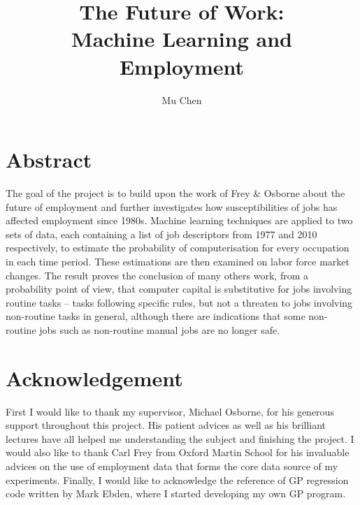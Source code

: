 \documentclass[11pt]{report}
\title{The Future of Work: \\ Machine Learning and Employment}
\author{Mu Chen}
\numberwithin{equation}{chapter}
\begin{document}
\newpage
\maketitle
\section*{Abstract}
The goal of the project is to build upon the work of Frey \& Osborne\cite{frey2013future} about the future of employment and further investigates how susceptibilities of jobs has affected employment since 1980s.  Machine learning techniques are applied to two sets of data, each containing a list of job descriptors from 1977 and 2010 respectively, to estimate the probability of computerisation for every occupation in each time period. These estimations are then examined on labor force market changes. The result proves the conclusion of many others work\cite{david2001skill}, from a probability point of view, that computer capital is substitutive for jobs involving routine tasks -- tasks following specific rules, but not a threaten to jobs involving non-routine tasks in general, although there are indications that some non-routine jobs such as non-routine manual jobs are no longer safe.

\newpage
\section*{Acknowledgement}
First I would like to thank my supervisor, Michael Osborne, for his generous support throughout this project. His patient advices as well as his brilliant lectures have all helped me understanding the subject and finishing the project. I would also like to thank Carl Frey from Oxford Martin School for his invaluable advices on the use of employment data that forms the core data source of my experiments. Finally, I would like to acknowledge the reference of GP regression code written by Mark Ebden, where I started developing my own GP program. 

\newpage 
{}
\lhead{} 
 
\tableofcontents
\end{document}
